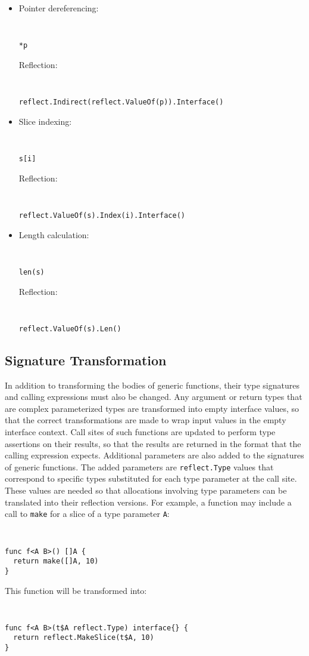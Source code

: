\documentclass[letterpaper,11pt]{article}
\begin{document}
\begin{itemize}
\item
Pointer dereferencing:
{ \tt \small
\begin{verbatim}
*p
\end{verbatim}
}
Reflection:
{ \tt \small
\begin{verbatim}
reflect.Indirect(reflect.ValueOf(p)).Interface()
\end{verbatim}
}

\item
Slice indexing:
{ \tt \small
\begin{verbatim}
s[i]
\end{verbatim}
}
Reflection:
{ \tt \small
\begin{verbatim}
reflect.ValueOf(s).Index(i).Interface()
\end{verbatim}
}

\item
Length calculation:
{ \tt \small
\begin{verbatim}
len(s)
\end{verbatim}
}
Reflection:
{ \tt \small
\begin{verbatim}
reflect.ValueOf(s).Len()
\end{verbatim}
}

\end{itemize}


\subsection{Signature Transformation} \label{signaturetransformation}

In addition to transforming the bodies of generic functions, their type signatures and calling expressions must also be changed. Any argument or return types that are complex parameterized types are transformed into empty interface values, so that the correct transformations are made to wrap input values in the empty interface context. Call sites of such functions are updated to perform type assertions on their results, so that the results are returned in the format that the calling expression expects. Additional parameters are also added to the signatures of generic functions. The added parameters are \texttt{reflect.Type} values that correspond to specific types substituted for each type parameter at the call site. These values are needed so that allocations involving type parameters can be translated into their reflection versions. For example, a function may include a call to \texttt{make} for a slice of a type parameter \texttt{A}:
{ \tt \small
\begin{verbatim}
func f<A B>() []A {
  return make([]A, 10)
}
\end{verbatim} 
}
This function will be transformed into:
{ \tt \small
\begin{verbatim}
func f<A B>(t$A reflect.Type) interface{} {
  return reflect.MakeSlice(t$A, 10)
}
\end{verbatim} 
}
\end{document}
